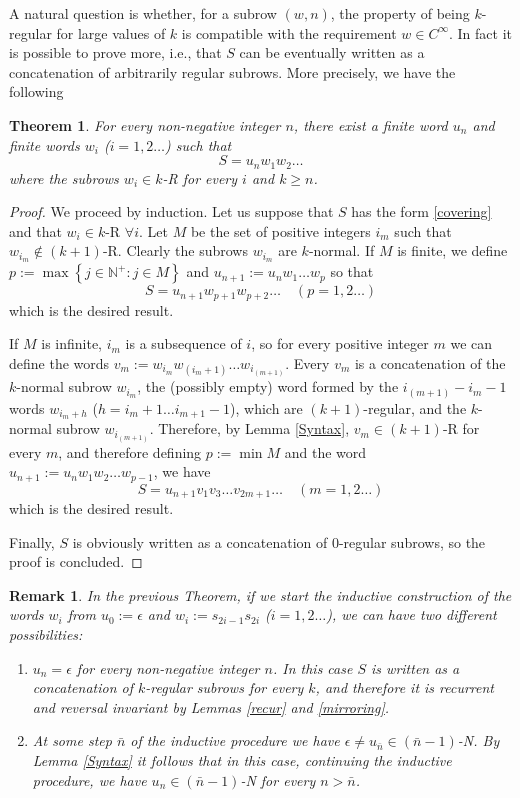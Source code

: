 \documentclass[10pt,a4paper]{article}
\newtheorem{theorem}{Theorem}
\newtheorem{rem}{Remark}
\begin{document}
A natural question is whether, for a subrow $(w,n)$, the property of being $k$-regular for large values of $k$ is compatible with the requirement $w\in C^\infty$. In fact it is possible to prove more, i.e., that $S$ can be eventually written as a concatenation of arbitrarily regular subrows. More precisely, we have the following
\begin{theorem}
For every non-negative integer $n$, there exist a finite word $u_n$ and finite words $w_i$ ($i=1,2\dots$) such that 
\begin{equation}
S=u_nw_1w_2\dots
\label{covering}
\end{equation}
where the subrows $w_i\in k$-R for every $i$ and $k\ge n$. 
\label{cover}
\end{theorem}
\begin{proof}
We proceed by induction. Let us suppose that $S$ has the form \eqref{covering} and that $w_i\in k$-R $\forall i$. Let $M$ be the set of positive integers $i_m$ such that $w_{i_m}\notin (k+1)$-R. Clearly the subrows $w_{i_m}$ are $k$-normal. If $M$ is finite, we define $p:=\max\left\lbrace j\in\mathbb{N}^+:j \in M\right\rbrace$ and $u_{n+1}:=u_nw_1\dots w_p$ so that
$$S=u_{n+1}w_{p+1}w_{p+2}\dots\quad (p=1,2\dots)$$
which is the desired result. 

If $M$ is infinite, $i_m$ is a subsequence of $i$, so for every positive integer $m$ we can define the words $v_m:=w_{i_m}w_{(i_m +1)}\dots w_{i_{(m+1)}}$. Every $v_m$ is a concatenation of the $k$-normal subrow $w_{i_m}$, the (possibly empty) word formed by the $i_{(m+1)}-i_m-1$ words $w_{i_m+h}$ ($h=i_m+1\dots i_{m+1}-1$), which are $(k+1)$-regular, and the $k$-normal subrow $w_{i_{(m+1)}}$.
Therefore, by Lemma \ref{Syntax}, $v_m\in(k+1)$-R for every $m$, and therefore defining $p:=\min M$ and the word $u_{n+1}:=u_nw_1w_2\dots w_{p-1}$, we have
\begin{equation}S=u_{n+1} v_1 v_3 \dots v_{2m+1}\dots\quad(m=1,2\dots)
\label{vconm}
\end{equation}
which is the desired result.

Finally, $S$ is obviously written as a concatenation of 0-regular subrows, so the proof is concluded.
\end{proof}
\begin{rem} In the previous Theorem, if we start the inductive construction of the words $w_i$ from $u_0:=\epsilon$ and $w_i:=s_{2i-1}s_{2i}$ ($i=1,2\dots$), we can have two different possibilities:
\begin{enumerate}
\item $u_n=\epsilon$ for every non-negative integer $n$. In this case $S$ is written as a concatenation of $k$-regular subrows for every $k$, and therefore it is recurrent and reversal invariant by Lemmas \ref{recur} and \ref{mirroring}.
\item At some step $\bar{n}$ of the inductive procedure we have $\epsilon\ne u_{\bar{n}}\in (\bar{n}-1)$-N. By Lemma \ref{Syntax} it follows that in this case, continuing the inductive procedure, we have $u_n\in (\bar{n}-1)$-N for every $n>\bar{n}$.
\end{enumerate}
\label{rem3}
\end{rem}
\end{document}
